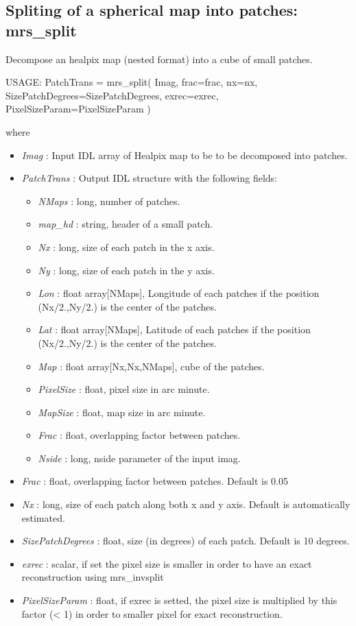 \subsection{Spliting of a spherical map into patches: mrs\_split}
Decompose an healpix map (nested format) into a cube of small patches.
{\bf
\begin{center}
     USAGE: PatchTrans = mrs\_split( Imag, frac=frac, nx=nx, SizePatchDegrees=SizePatchDegrees, exrec=exrec, PixelSizeParam=PixelSizeParam )
\end{center}}
where
\begin{itemize}
\item {\em Imag} : Input IDL array of Healpix map to be to be decomposed into patches.
\item {\em PatchTrans} : Output IDL structure with the following fields:
\begin{itemize}
\item {\em NMaps} : long, number of patches.
\item {\em map\_hd} : string, header of a small patch.
\item {\em Nx} : long, size of each patch in the x axis.
\item {\em Ny} : long, size of each patch in the y axis.
\item {\em Lon} : float array[NMaps], Longitude of each patches if the position (Nx/2.,Ny/2.) is the center of the patches.
\item {\em Lat} : float array[NMaps], Latitude of each patches if the position (Nx/2.,Ny/2.) is the center of the patches.
\item {\em Map} : float array[Nx,Nx,NMaps], cube of the patches.
\item {\em PixelSize} : float, pixel size in arc minute.
\item {\em MapSize} : float, map size in arc minute.
\item {\em Frac} : float, overlapping factor between patches.
\item {\em Nside} : long, nside parameter of the input imag.
\end{itemize}
\item {\em Frac} : float, overlapping factor between patches. Default is 0.05
\item {\em Nx} : long, size of each patch along both x and y axis. Default is automatically estimated.
\item {\em SizePatchDegrees} : float, size (in degrees) of each patch. Default is 10 degrees.
\item {\em exrec} : scalar, if set the pixel size is smaller in order to have an exact reconstruction using mrs\_invsplit
\item {\em PixelSizeParam} : float, if exrec is setted, the pixel size is multiplied by this factor (< 1) in order to smaller pixel for exact reconstruction.
\end{itemize}

